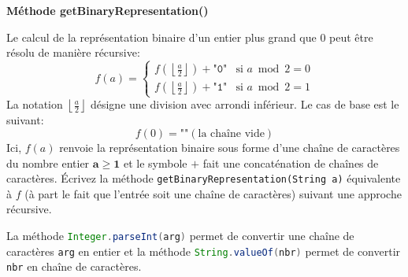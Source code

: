 \begin{Exercice}[10 minutes] [Java] \textbf{Méthode getBinaryRepresentation()} 
	
 Le calcul de la représentation binaire d'un entier plus grand que 0 peut être résolu de manière récursive: 
 \begin{equation}
    f(a) = \begin{cases}
        f\left(\left\lfloor\frac{a}{2}\right\rfloor\right) + \texttt{"0"} & \text{si } a \bmod 2 = 0 \\
        f\left(\left\lfloor\frac{a}{2}\right\rfloor\right) + \texttt{"1"} & \text{si } a \bmod 2 = 1
    \end{cases}
\end{equation}
La notation $\left\lfloor\frac{a}{2}\right\rfloor$ désigne une division avec arrondi inférieur.
Le cas de base est le suivant:
\begin{equation}
f(0) = \texttt{""} (\text{la chaîne vide})
\end{equation}
Ici, $f(a)$ renvoie la représentation binaire sous forme d'une chaîne de caractères du nombre entier $\mathbf{a\geq 1}$ et le symbole $+$ fait une concaténation de chaînes de caractères.\newline  \newline 
        Écrivez la méthode \lstinline{getBinaryRepresentation(String a)} équivalente à $f$ (à part le fait que l'entrée soit une chaîne de caractères) suivant une approche récursive. \\ 
        
            \begin{conseil} 
            La méthode \lstinline[language=Java]|Integer.parseInt(arg)| permet de convertir une chaîne de caractères \texttt{arg} en entier et la méthode \lstinline[language=Java]|String.valueOf(nbr)| permet de convertir \texttt{nbr} en chaîne de caractères.  
            \end{conseil} 
        
            \begin{solution}
                
            \end{solution}
\end{Exercice}
    
        

